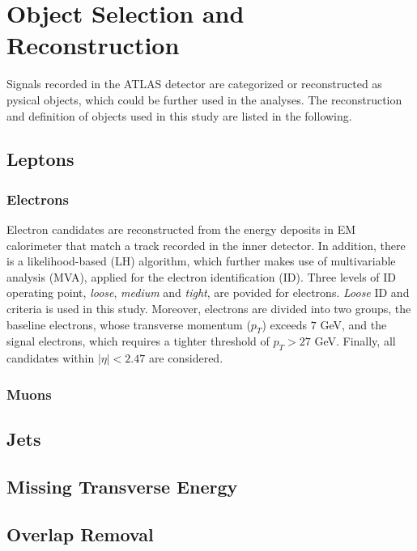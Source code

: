 \documentclass[class=NCU_thesis, crop=false]{standalone}
\begin{document}
\chapter{Object Selection and Reconstruction}
	Signals recorded in the ATLAS detector are categorized or reconstructed as pysical objects, which could be further used in the analyses. The reconstruction and definition of objects used in this study are listed in the following.
	
\section{Leptons}
	\subsection{Electrons}
		Electron candidates are reconstructed from the energy deposits in EM calorimeter that match a track recorded in the inner detector. In addition, there is a likelihood-based (LH) algorithm, which further makes use of multivariable analysis (MVA), applied for the electron identification (ID). Three levels of ID operating point, \textit{loose}, \textit{medium} and \textit{tight}, are povided for electrons. \textit{Loose} ID and criteria is used in this study. Moreover, electrons are divided into two groups, the baseline electrons, whose transverse momentum ($p_T$) exceeds $7$ GeV, and the signal electrons, which requires a tighter threshold of $p_T > 27$ GeV. Finally, all candidates within $\lvert \eta \rvert < 2.47$ are considered.
		
	\subsection{Muons}
		

\section{Jets}
	
\section{Missing Transverse Energy}
	
\section{Overlap Removal}
\end{document}
